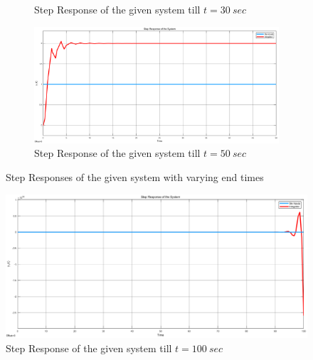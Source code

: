 \documentclass[a4paper,12pt]{article}
\begin{document}
\begin{enumerate}
\begin{enumerate}
\begin{figure}[H]
\begin{subfigure}{.5\textwidth}
				\caption{\label{fig:sb3} Step Response of the given system till $t=30\ sec$ }
			\end{subfigure}%
			\begin{subfigure}{.5\textwidth}
				\centering
				\includegraphics[width=0.48\unitlength]{images/stepb4}
				\caption{\label{fig:sb4} Step Response of the given system till $t=50\ sec$ }
			\end{subfigure}
			\caption{\label{fig:step2} Step Responses of the given system with varying end times  }	
		\end{figure}
	
		\begin{figure}[H]
			\center
			\setlength{\unitlength}{\textwidth} 
			\includegraphics[width=1.0\unitlength]{images/stepb5}
			\caption{\label{fig:sb5} Step Response of the given system till $t=100\ sec$ }
		\end{figure}
	
	 	
	\end{enumerate}
\end{enumerate}
	
\end{document}
